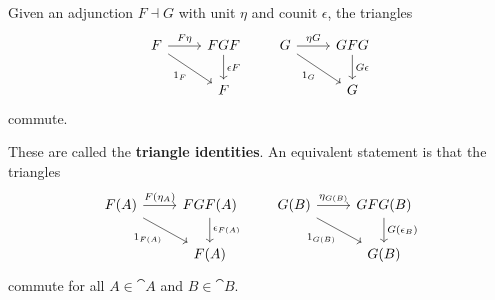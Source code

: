 \documentclass[11pt,a4paper]{article}
\begin{document}
\begin{lemma}\label{lemma:adjunction}
    Given an adjunction $F\dashv G$ with unit $\eta$ and counit $\epsilon$, the triangles
    \begin{equation*}
    \begin{tikzcd}
        F \arrow[r, "F\eta"] \arrow[dr, "1_F"'] & FGF \arrow[d, "\epsilon F"] \\
        & F
    \end{tikzcd}
    \qquad
    \begin{tikzcd}
        G \arrow[r, "\eta G"] \arrow[dr, "1_G"'] & GFG \arrow[d, "G\epsilon"] \\
        & G
    \end{tikzcd}
    \end{equation*}
    commute.
\end{lemma}
\begin{remark}
    These are called the \textbf{triangle identities}. An equivalent statement is that the triangles
    \begin{equation}\label{lemma:triangle_identities}
    \begin{tikzcd}
        F(A) \arrow[r, "F(\eta_A)"] \arrow[dr, "1_{F(A)}"'] & FGF(A) \arrow[d, "\epsilon_{F(A)}"] \\
        & F(A)
    \end{tikzcd}
    \qquad
    \begin{tikzcd}
        G(B) \arrow[r, "\eta_{G(B)}"] \arrow[dr, "1_{G(B)}"'] & GFG(B) \arrow[d, "G(\epsilon_B)"] \\
        & G(B)
    \end{tikzcd}
    \end{equation}
    commute for all $A\in\cat{A}$ and $B\in\cat{B}$.
\end{remark}
\end{document}

